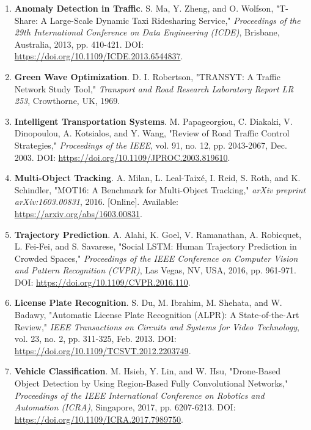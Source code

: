 \begin{enumerate}[resume]
    \item \textbf{Anomaly Detection in Traffic}. S. Ma, Y. Zheng, and O. Wolfson, "T-Share: A Large-Scale Dynamic Taxi Ridesharing Service," 
    \textit{Proceedings of the 29th International Conference on Data Engineering (ICDE)}, 
    Brisbane, Australia, 2013, pp. 410-421. DOI: \url{https://doi.org/10.1109/ICDE.2013.6544837}.
    
    \item \textbf{Green Wave Optimization}. D. I. Robertson, "TRANSYT: A Traffic Network Study Tool," 
    \textit{Transport and Road Research Laboratory Report LR 253}, Crowthorne, UK, 1969.
    
    \item \textbf{Intelligent Transportation Systems}. M. Papageorgiou, C. Diakaki, V. Dinopoulou, A. Kotsialos, and Y. Wang, 
    "Review of Road Traffic Control Strategies," \textit{Proceedings of the IEEE}, vol. 91, no. 12, pp. 2043-2067, Dec. 2003. 
    DOI: \url{https://doi.org/10.1109/JPROC.2003.819610}.
    
    \item \textbf{Multi-Object Tracking}. A. Milan, L. Leal-Taixé, I. Reid, S. Roth, and K. Schindler, 
    "MOT16: A Benchmark for Multi-Object Tracking," \textit{arXiv preprint arXiv:1603.00831}, 2016. 
    [Online]. Available: \url{https://arxiv.org/abs/1603.00831}.
    
    \item \textbf{Trajectory Prediction}. A. Alahi, K. Goel, V. Ramanathan, A. Robicquet, L. Fei-Fei, and S. Savarese, 
    "Social LSTM: Human Trajectory Prediction in Crowded Spaces," 
    \textit{Proceedings of the IEEE Conference on Computer Vision and Pattern Recognition (CVPR)}, 
    Las Vegas, NV, USA, 2016, pp. 961-971. DOI: \url{https://doi.org/10.1109/CVPR.2016.110}.
    
    \item \textbf{License Plate Recognition}. S. Du, M. Ibrahim, M. Shehata, and W. Badawy, 
    "Automatic License Plate Recognition (ALPR): A State-of-the-Art Review," 
    \textit{IEEE Transactions on Circuits and Systems for Video Technology}, vol. 23, no. 2, pp. 311-325, Feb. 2013. 
    DOI: \url{https://doi.org/10.1109/TCSVT.2012.2203749}.
    
    \item \textbf{Vehicle Classification}. M. Hsieh, Y. Lin, and W. Hsu, "Drone-Based Object Detection by Using Region-Based Fully Convolutional Networks," 
    \textit{Proceedings of the IEEE International Conference on Robotics and Automation (ICRA)}, 
    Singapore, 2017, pp. 6207-6213. DOI: \url{https://doi.org/10.1109/ICRA.2017.7989750}.
    

\end{enumerate}
